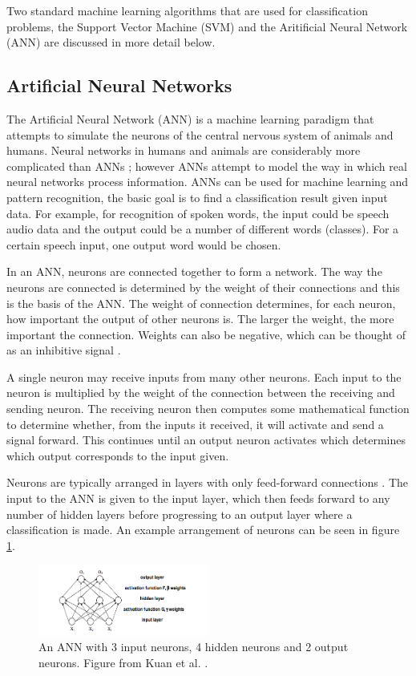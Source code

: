 Two standard machine learning algorithms that are used for classification problems, the Support Vector Machine (SVM) and the Aritificial Neural Network (ANN) are discussed in more detail below. 

\subsection{Artificial Neural Networks}
\label{ANNAppendix}

The Artificial Neural Network (ANN) is a machine learning paradigm that attempts to simulate the neurons of the central nervous system of animals and humans. Neural networks in humans and animals are considerably more complicated than ANNs \cite{Graupe2013}; however ANNs attempt to model the way in which real neural networks process information. ANNs can be used for machine learning and pattern recognition, the basic goal is to find a classification result given input data. For example, for recognition of spoken words, the input could be speech audio data and the output could be a number of different words (classes). For a certain speech input, one output word would be chosen. 

In an ANN, neurons are connected together to form a network. The way the neurons are connected is determined by the weight of their connections and this is the basis of the ANN. The weight of connection determines, for each neuron, how important the output of other neurons is. The larger the weight, the more important the connection. Weights can also be negative, which can be thought of as an inhibitive signal \cite{Graupe2013}.

A single neuron may receive inputs from many other neurons. Each input to the neuron is multiplied by the weight of the connection between the receiving and sending neuron. The receiving neuron then computes some mathematical function to determine whether, from the inputs it received, it will activate and send a signal forward. This continues until an output neuron activates which determines which output corresponds to the input given. 

Neurons are typically arranged in layers with only feed-forward connections \cite{Kuan}. The input to the ANN is given to the input layer, which then feeds forward to any number of hidden layers before progressing to an output layer where a classification is made. An example arrangement of neurons can be seen in figure \ref{ANN}. 

\begin{figure}[ht!]
\begin{center}
\leavevmode
\includegraphics[width=0.5\textwidth]{images/ANN.png}
\end{center}
\caption[Example Artificial Neural Network]{An ANN with 3 input neurons, 4 hidden neurons and 2 output neurons. Figure from Kuan et al. \cite{Kuan}.}
\label{ANN}
\end{figure}

